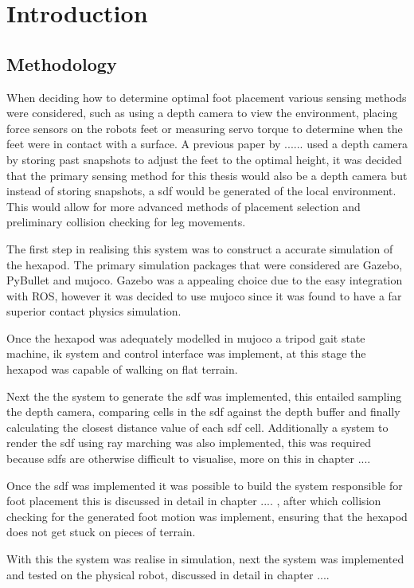 \chapter{Introduction}

\section{Methodology}
When deciding how to determine optimal foot placement various sensing methods were considered, such as using a depth camera to view the environment,
placing force sensors on the robots feet or measuring servo torque to determine when the feet were in contact with a surface. A previous paper by ...... used a depth
camera by storing past snapshots to adjust the feet to the optimal height, it was decided that the primary sensing method for this thesis would also be a depth camera
but instead of storing snapshots, a \ac{sdf} would be generated of the local environment. This would allow for more advanced methods of placement selection
and preliminary collision checking for leg movements.

The first step in realising this system was to construct a accurate simulation of the hexapod. The primary simulation packages that were considered are Gazebo, PyBullet and \ac{mujoco}.
Gazebo was a appealing choice due to the easy integration with ROS, however it was decided to use \ac{mujoco} since it was found to have a far superior contact physics simulation.

Once the hexapod was adequately modelled in \ac{mujoco} a tripod gait state machine, \ac{ik} system and control interface was implement, at this stage the hexapod was capable of walking
on flat terrain.

Next the the system to generate the \ac{sdf} was implemented, this entailed sampling the depth camera, comparing cells in the \ac{sdf} against the depth buffer and finally calculating
the closest distance value of each \ac{sdf} cell. Additionally a system to render the \ac{sdf} using ray marching was also implemented, this was required because \ac{sdf}s are otherwise 
difficult to visualise, more on this in chapter ....

Once the \ac{sdf} was implemented it was possible to build the system responsible for foot placement this is discussed in detail in chapter .... , after which collision checking for the generated
foot motion was implement, ensuring that the hexapod does not get stuck on pieces of terrain.

With this the system was realise in simulation, next the system was implemented and tested on the physical robot, discussed in detail in chapter ....


